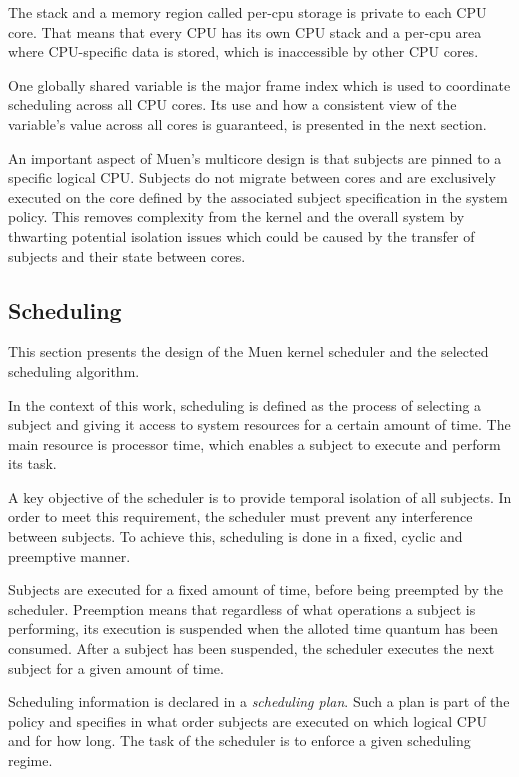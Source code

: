 The stack and a memory region called per-cpu storage is private to each CPU
core. That means that every CPU has its own CPU stack and a per-cpu area where
CPU-specific data is stored, which is inaccessible by other CPU cores.

One globally shared variable is the major frame index which is used to
coordinate scheduling across all CPU cores. Its use and how a consistent view of
the variable's value across all cores is guaranteed, is presented in the next
section.

An important aspect of Muen's multicore design is that subjects are pinned to a
specific logical CPU. Subjects do not migrate between cores and are exclusively
executed on the core defined by the associated subject specification in the
system policy. This removes complexity from the kernel and the overall system by
thwarting potential isolation issues which could be caused by the transfer of
subjects and their state between cores.

\subsection{Scheduling}\label{subsec:scheduling}
This section presents the design of the Muen kernel scheduler and the selected
scheduling algorithm.

In the context of this work, scheduling is defined as the process of selecting
a subject and giving it access to system resources for a certain amount of time.
The main resource is processor time, which enables a subject to execute and
perform its task.

A key objective of the scheduler is to provide temporal isolation of all
subjects. In order to meet this requirement, the scheduler must prevent any
interference between subjects. To achieve this, scheduling is done in a fixed,
cyclic and preemptive manner.

Subjects are executed for a fixed amount of time, before being preempted by the
scheduler. Preemption means that regardless of what operations a subject is
performing, its execution is suspended when the alloted time quantum has been
consumed. After a subject has been suspended, the scheduler executes the next
subject for a given amount of time.

Scheduling information is declared in a \emph{scheduling plan}. Such a plan is part of the policy and specifies in what order subjects
are executed on which logical CPU and for how long. The task of the scheduler is
to enforce a given scheduling regime.

